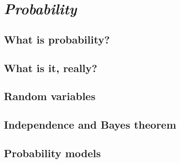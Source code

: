 \chapter{\emph{Probability}} 
\label{probability}

\section{What is probability?}

\section{What is it, really?}

\section{Random variables}

\section{Independence and Bayes theorem}

\section{Probability models}
